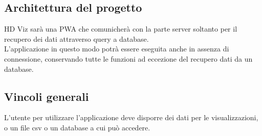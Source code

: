 \subsection{Architettura del progetto}
HD Viz sarà una PWA che comunicherà con la parte server soltanto per il recupero dei dati attraverso query a database.
\\
L'applicazione in questo modo potrà essere eseguita anche in assenza di connessione, conservando tutte le funzioni ad eccezione del recupero dati da un database.

\subsection{Vincoli generali}
L'utente per utilizzare l'applicazione deve disporre dei dati per le visualizzazioni, o un file csv o un database a cui può accedere.